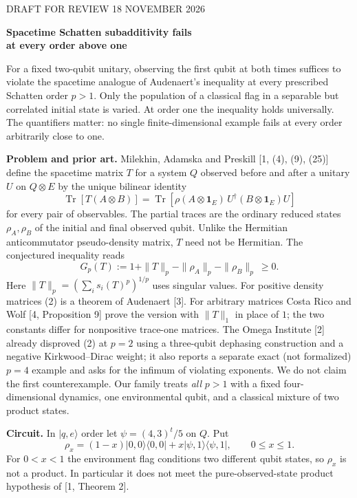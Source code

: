 \documentclass[11pt]{article}
\newcommand{\Tr}{\operatorname{Tr}}\newcommand{\1}{\mathbf1}\newcommand{\ket}[1]{|#1\rangle}\newcommand{\bra}[1]{\langle #1|}
\begin{document}
{\small DRAFT FOR REVIEW \hfill 18 NOVEMBER 2026}
\begin{center}{\Large\bfseries Spacetime Schatten subadditivity fails\\ at every order above one}\end{center}
For a fixed two-qubit unitary, observing the first qubit at both times suffices to violate the spacetime analogue of Audenaert's inequality at every prescribed Schatten order $p>1$. Only the population of a classical flag in a separable but correlated initial state is varied. At order one the inequality holds universally. The quantifiers matter: no single finite-dimensional example fails at every order arbitrarily close to one.

\textbf{Problem and prior art.} Milekhin, Adamska and Preskill [1, (4), (9), (25)] define the spacetime matrix $T$ for a system $Q$ observed before and after a unitary $U$ on $Q\otimes E$ by the unique bilinear identity
\[
 \Tr[T(A\otimes B)]
 =\Tr\!\left[\rho(A\otimes\1_E)\,U^\dagger(B\otimes\1_E)U\right]                  \tag{1}
\]
for every pair of observables. The partial traces are the ordinary reduced states $\rho_A,\rho_B$ of the initial and final observed qubit. Unlike the Hermitian anticommutator pseudo-density matrix, $T$ need not be Hermitian. The conjectured inequality reads
\[
 G_p(T):=1+\|T\|_p-\|\rho_A\|_p-\|\rho_B\|_p\ \ge 0.                         \tag{2}
\]
Here $\|T\|_p=(\sum_i s_i(T)^p)^{1/p}$ uses singular values. For positive density matrices (2) is a theorem of Audenaert [3]. For arbitrary matrices Costa Rico and Wolf [4, Proposition 9] prove the version with $\|T\|_1$ in place of $1$; the two constants differ for nonpositive trace-one matrices. The Omega Institute [2] already disproved (2) at $p=2$ using a three-qubit dephasing construction and a negative Kirkwood--Dirac weight; it also reports a separate exact (not formalized) $p=4$ example and asks for the infimum of violating exponents. We do not claim the first counterexample. Our family treats \emph{all} $p>1$ with a fixed four-dimensional dynamics, one environmental qubit, and a classical mixture of two product states.

\textbf{Circuit.} In $\ket{q,e}$ order let $\psi=(4,3)^t/5$ on $Q$. Put
\[
 \rho_x=(1-x)\ket{0,0}\bra{0,0}+x\ket{\psi,1}\bra{\psi,1},\qquad 0\le x\le1.
\]
For $0<x<1$ the environment flag conditions two different qubit states, so $\rho_x$ is not a product. In particular it does not meet the pure-observed-state product hypothesis of [1, Theorem 2].
\end{document}
